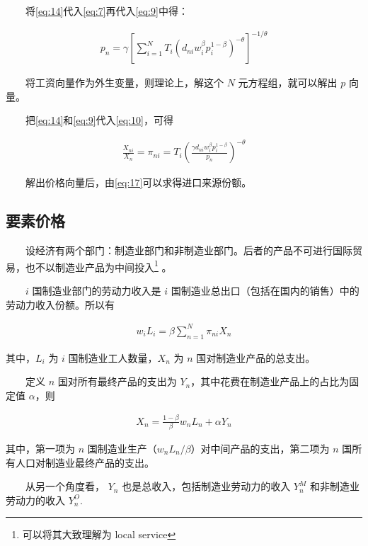 \documentclass[
]{article}
\begin{document}
　　将\eqref{eq:14}代入\eqref{eq:7}再代入\eqref{eq:9}中得：

\begin{align}
p_{n}=\gamma\left[\sum_{i=1}^{N} T_{i}\left(d_{n i} w_{i}^{\beta} p_{i}^{1-\beta}\right)^{-\theta}\right]^{-1 / \theta} \label{eq:16}
\end{align}

　　将工资向量作为外生变量，则理论上，解这个 \(N\) 元方程组，就可以解出 \(p\) 向量。

　　把\eqref{eq:14}和\eqref{eq:9}代入\eqref{eq:10}，可得

\begin{align}
\frac{X_{n i}}{X_{n}}=\pi_{n i}=T_{i}\left(\frac{\gamma d_{n i} w_{i}^{\beta} p_{i}^{1-\beta}}{p_{n}}\right)^{-\theta} \label{eq:17}
\end{align}

　　解出价格向量后，由\eqref{eq:17}可以求得进口来源份额。

\hypertarget{ux8981ux7d20ux4ef7ux683c}{%
\subsection{要素价格}\label{ux8981ux7d20ux4ef7ux683c}}

　　设经济有两个部门：制造业部门和非制造业部门。后者的产品不可进行国际贸易，也不以制造业产品为中间投入\footnote{可以将其大致理解为 local service} 。

　　\(i\) 国制造业部门的劳动力收入是 \(i\) 国制造业总出口（包括在国内的销售）中的劳动力收入份额。所以有

\begin{align}
w_{i} L_{i}=\beta \sum_{n=1}^{N} \pi_{n i} X_{n} \label{eq:18}
\end{align}

其中，\(L_i\) 为 \(i\) 国制造业工人数量，\(X_n\) 为 \(n\) 国对制造业产品的总支出。

　　定义 \(n\) 国对所有最终产品的支出为 \(Y_n\)，其中花费在制造业产品上的占比为固定值 \(\alpha\)，则

\begin{align}
X_{n}=\frac{1-\beta}{\beta} w_{n} L_{n}+\alpha Y_{n} \label{eq:19}
\end{align}

其中，第一项为 \(n\) 国制造业生产（\(w_{n}L_{n}/\beta\)）对中间产品的支出，第二项为 \(n\) 国所有人口对制造业最终产品的支出。

　　从另一个角度看， \(Y_n\) 也是总收入，包括制造业劳动力的收入 \(Y_n^M\) 和非制造业劳动力的收入 \(Y_n^O\).
\end{document}
